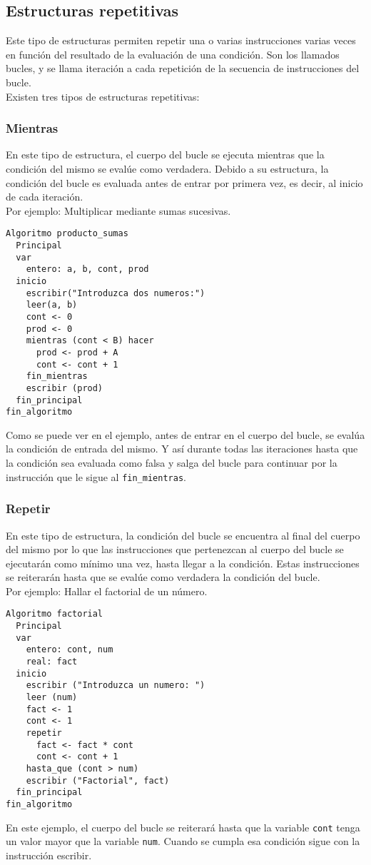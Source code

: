 \documentclass[12pt,letterpaper]{article}
\begin{document}
\subsection{Estructuras repetitivas}

Este tipo de estructuras permiten repetir una o varias instrucciones varias veces en función del resultado de la evaluación de una condición. Son los llamados bucles, y se llama iteración a cada repetición de la secuencia de instrucciones del bucle.\\
Existen tres tipos de estructuras repetitivas:

\subsubsection{Mientras}

En este tipo de estructura, el cuerpo del bucle se ejecuta mientras que la condición del mismo se evalúe como verdadera. Debido a su estructura, la condición del bucle es evaluada antes de entrar por primera vez, es decir, al inicio de cada iteración.\\
Por ejemplo: Multiplicar mediante sumas sucesivas.
\newpage
\begin{lstlisting}
Algoritmo producto_sumas
  Principal
  var
    entero: a, b, cont, prod
  inicio
    escribir("Introduzca dos numeros:")
    leer(a, b)
    cont <- 0
    prod <- 0
    mientras (cont < B) hacer
      prod <- prod + A
      cont <- cont + 1
    fin_mientras
    escribir (prod)
  fin_principal
fin_algoritmo
\end{lstlisting}
Como se puede ver en el ejemplo, antes de entrar en el cuerpo del bucle, se evalúa la condición de entrada del mismo. Y así durante todas las iteraciones hasta que la condición sea evaluada como falsa y salga del bucle para continuar por la instrucción que le sigue al \texttt{fin\_mientras}.

\subsubsection{Repetir}

En este tipo de estructura, la condición del bucle se encuentra al final del cuerpo del mismo por lo que las instrucciones que pertenezcan al cuerpo del bucle se ejecutarán como mínimo una vez, hasta llegar a la condición. Estas instrucciones se reiterarán hasta que se evalúe como verdadera la condición del bucle.\\
Por ejemplo: Hallar el factorial de un número.
\begin{lstlisting}
Algoritmo factorial
  Principal
  var
    entero: cont, num
    real: fact
  inicio
    escribir ("Introduzca un numero: ")
    leer (num)
    fact <- 1
    cont <- 1
    repetir
      fact <- fact * cont
      cont <- cont + 1
    hasta_que (cont > num)
    escribir ("Factorial", fact)
  fin_principal
fin_algoritmo
\end{lstlisting}
En este ejemplo, el cuerpo del bucle se reiterará hasta que la variable \texttt{cont} tenga un valor mayor que la variable \texttt{num}. Cuando se cumpla esa condición sigue con la instrucción escribir.
\end{document}
